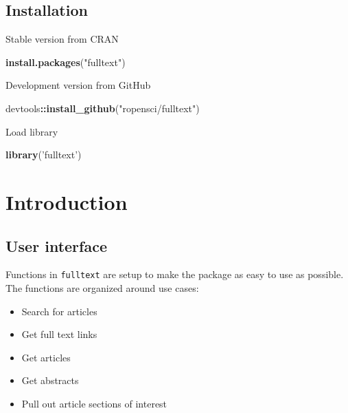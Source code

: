 \documentclass[]{book}
\newenvironment{Shaded}{\begin{snugshade}}{\end{snugshade}}
\newcommand{\KeywordTok}[1]{\textcolor[rgb]{0.13,0.29,0.53}{\textbf{#1}}}
\newcommand{\NormalTok}[1]{#1}
\newcommand{\OperatorTok}[1]{\textcolor[rgb]{0.81,0.36,0.00}{\textbf{#1}}}
\newcommand{\StringTok}[1]{\textcolor[rgb]{0.31,0.60,0.02}{#1}}
\providecommand{\tightlist}{%
  \setlength{\itemsep}{0pt}\setlength{\parskip}{0pt}}
\theoremstyle{definition}
\theoremstyle{definition}
\theoremstyle{definition}
\theoremstyle{remark}
\begin{document}
\hypertarget{installation}{%
\section{Installation}\label{installation}}

Stable version from CRAN

\begin{Shaded}
\begin{Highlighting}[]
\KeywordTok{install.packages}\NormalTok{(}\StringTok{"fulltext"}\NormalTok{)}
\end{Highlighting}
\end{Shaded}

Development version from GitHub

\begin{Shaded}
\begin{Highlighting}[]
\NormalTok{devtools}\OperatorTok{::}\KeywordTok{install_github}\NormalTok{(}\StringTok{"ropensci/fulltext"}\NormalTok{)}
\end{Highlighting}
\end{Shaded}

Load library

\begin{Shaded}
\begin{Highlighting}[]
\KeywordTok{library}\NormalTok{(}\StringTok{'fulltext'}\NormalTok{)}
\end{Highlighting}
\end{Shaded}

\hypertarget{intro}{%
\chapter{Introduction}\label{intro}}

\hypertarget{user-interface}{%
\section{User interface}\label{user-interface}}

Functions in \texttt{fulltext} are setup to make the package as easy to
use as possible. The functions are organized around use cases:

\begin{itemize}
\tightlist
\item
  Search for articles
\item
  Get full text links
\item
  Get articles
\item
  Get abstracts
\item
  Pull out article sections of interest
\end{itemize}
\end{document}
